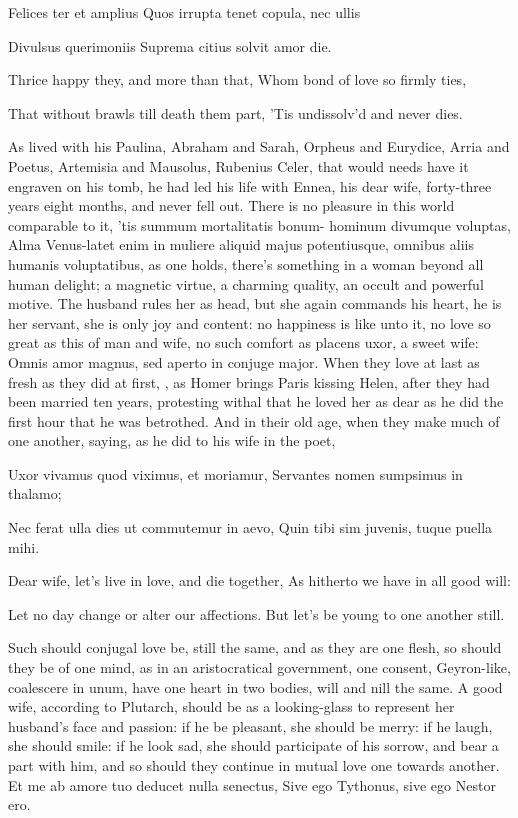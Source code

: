 Felices ter et amplius
Quos irrupta tenet copula, nec ullis

Divulsus querimoniis
Suprema citius solvit amor die.


Thrice happy they, and more than that,
Whom bond of love so firmly ties,

That without brawls till death them part,
'Tis undissolv'd and never dies.

As \Seneca{} lived with his Paulina, Abraham and Sarah, Orpheus and
Eurydice, Arria and Poetus, Artemisia and Mausolus, Rubenius Celer,
that would needs have it engraven on his tomb, he had led his life with
Ennea, his dear wife, forty-three years eight months, and never fell
out. There is no pleasure in this world comparable to it, 'tis summum
mortalitatis bonum- hominum divumque voluptas, Alma Venus-latet
enim in muliere aliquid majus potentiusque, omnibus aliis humanis
voluptatibus, as one holds, there's something in a woman beyond
all human delight; a magnetic virtue, a charming quality, an occult and
powerful motive. The husband rules her as head, but she again commands
his heart, he is her servant, she is only joy and content: no happiness
is like unto it, no love so great as this of man and wife, no such
comfort as placens uxor, a sweet wife: Omnis amor magnus,
sed aperto in conjuge major. When they love at last as fresh as they
did at first, , as Homer brings
Paris kissing Helen, after they had been married ten years, protesting
withal that he loved her as dear as he did the first hour that he was
betrothed. And in their old age, when they make much of one another,
saying, as he did to his wife in the poet,

Uxor vivamus quod viximus, et moriamur,
Servantes nomen sumpsimus in thalamo;

Nec ferat ulla dies ut commutemur in aevo,
Quin tibi sim juvenis, tuque puella mihi.


Dear wife, let's live in love, and die together,
As hitherto we have in all good will:

Let no day change or alter our affections.
But let's be young to one another still.

Such should conjugal love be, still the same, and as they are one
flesh, so should they be of one mind, as in an aristocratical
government, one consent, Geyron-like, coalescere in unum, have
one heart in two bodies, will and nill the same. A good wife, according
to Plutarch, should be as a looking-glass to represent her husband's
face and passion: if he be pleasant, she should be merry: if he laugh,
she should smile: if he look sad, she should participate of his sorrow,
and bear a part with him, and so should they continue in mutual love
one towards another.
Et me ab amore tuo deducet nulla senectus,
Sive ego Tythonus, sive ego Nestor ero.

